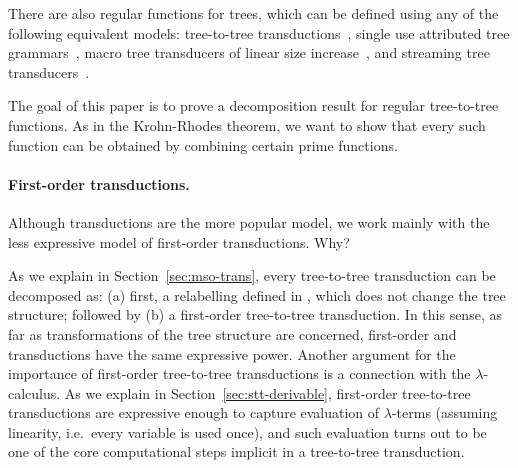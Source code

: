 There are also regular functions for trees, which can be defined using any of the following equivalent models: \mso tree-to-tree transductions~\cite[Section 3]{bloem_comparison_2000}, single use attributed tree grammars~\cite{bloem_comparison_2000}, macro tree transducers of linear size increase~\cite[Theorem 7.1]{engelfriet_macro_2003}, and streaming tree transducers~\cite[Theorem 4.6]{alur2017streaming}. 

The goal of this paper is to prove a decomposition result for regular tree-to-tree functions. As in the Krohn-Rhodes theorem, we want to show that every such function can be obtained by combining certain prime functions.  

\paragraph*{First-order transductions. } Although \mso transductions are the more popular model, we work mainly with the less expressive model of first-order transductions. Why?

As we explain in Section~\ref{sec:mso-trans}, every \mso tree-to-tree transduction can be decomposed as: (a) first, a relabelling defined in \mso, which does not change the tree structure; followed by (b) a first-order tree-to-tree transduction. In this sense, as far as transformations of the tree structure are concerned,  first-order and \mso transductions have the same expressive power. Another argument for the importance of first-order tree-to-tree transductions is a connection with the $\lambda$-calculus. As we explain in Section~\ref{sec:stt-derivable}, first-order tree-to-tree transductions are expressive enough to capture evaluation of $\lambda$-terms (assuming linearity, i.e.~every variable is used once), and such evaluation turns out to be one of the core computational steps implicit in a tree-to-tree transduction. 

